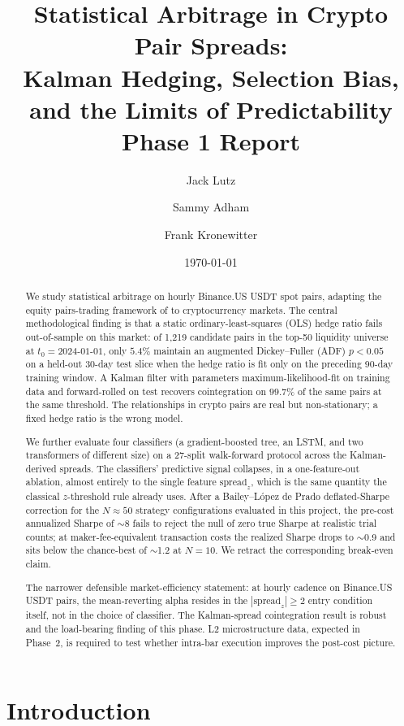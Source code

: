\documentclass[11pt]{article}
\title{Statistical Arbitrage in Crypto Pair Spreads:\\
Kalman Hedging, Selection Bias, and the Limits of Predictability\\
\large{Phase 1 Report}}
\author{Jack Lutz \and Sammy Adham \and Frank Kronewitter}
\affil{University of California, Los Angeles}
\date{\today}
\begin{document}
\maketitle

\begin{abstract}
We study statistical arbitrage on hourly Binance.US USDT spot pairs,
adapting the equity pairs-trading framework of \citet{gatev2006pairs} to
cryptocurrency markets. The central methodological finding is that a static
ordinary-least-squares (OLS) hedge ratio fails out-of-sample on this
market: of 1{,}219 candidate pairs in the top-50 liquidity universe at
$t_0 = 2024\text{-}01\text{-}01$, only $5.4\%$ maintain an augmented
Dickey--Fuller (ADF) $p < 0.05$ on a held-out 30-day test slice when the
hedge ratio is fit only on the preceding 90-day training window. A Kalman
filter with parameters maximum-likelihood-fit on training data and
forward-rolled on test recovers cointegration on $99.7\%$ of the same
pairs at the same threshold. The relationships in crypto pairs are real
but non-stationary; a fixed hedge ratio is the wrong model.

We further evaluate four classifiers (a gradient-boosted tree, an LSTM,
and two transformers of different size) on a 27-split walk-forward
protocol across the Kalman-derived spreads. The classifiers' predictive
signal collapses, in a one-feature-out ablation, almost entirely to the
single feature $\text{spread}_z$, which is the same quantity the
classical $z$-threshold rule already uses. After a Bailey--L\'opez de
Prado deflated-Sharpe correction for the $N \approx 50$ strategy
configurations evaluated in this project, the pre-cost annualized Sharpe
of $\sim$8 fails to reject the null of zero true Sharpe at realistic
trial counts; at maker-fee-equivalent transaction costs the realized
Sharpe drops to $\sim$0.9 and sits below the chance-best of $\sim$1.2 at
$N = 10$. We retract the corresponding break-even claim.

The narrower defensible market-efficiency statement: at hourly cadence
on Binance.US USDT pairs, the mean-reverting alpha resides in the
$|\text{spread}_z| \geq 2$ entry condition itself, not in the choice of
classifier. The Kalman-spread cointegration result is robust and the
load-bearing finding of this phase. L2 microstructure data, expected in
Phase~2, is required to test whether intra-bar execution improves the
post-cost picture.
\end{abstract}

\section{Introduction}
\end{document}
